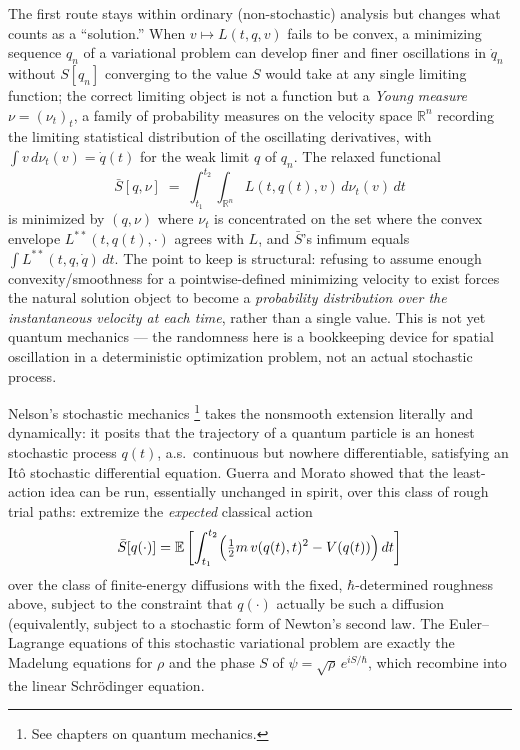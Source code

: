 The first route stays within ordinary (non-stochastic) analysis but changes
what counts as a ``solution.'' When $v\mapsto L(t,q,v)$ fails to be convex, a
minimizing sequence $q_n$ of a variational problem can develop finer and finer
oscillations in $\dot q_n$ without $S[q_n]$ converging to the value $S$ would
take at any single limiting function; the correct limiting object is not a
function but a \emph{Young measure} $\nu=(\nu_t)_{t}$, a family of probability
measures on the velocity space $\mathbb{R}^n$ recording the limiting statistical
distribution of the oscillating derivatives, with $\int v\,d\nu_t(v)=\dot q(t)$
for the weak limit $q$ of $q_n$. The relaxed functional
\[
\bar S[q,\nu] \;=\; \int_{t_1}^{t_2}\!\! \int_{\mathbb{R}^n} L(t,q(t),v)\, d\nu_t(v)\, dt
\]
is minimized by $(q,\nu)$ where $\nu_t$ is concentrated on the set where the
convex envelope $L^{\ast\ast}(t,q(t),\cdot)$ agrees with $L$, and $\bar S$'s
infimum equals $\int L^{\ast\ast}(t,q,\dot q)\,dt$. The point to keep is
structural: refusing to assume enough convexity/smoothness for a
pointwise-defined minimizing velocity to exist forces the natural solution
object to become a \emph{probability distribution over the instantaneous
velocity at each time}, rather than a single value. This is not yet quantum
mechanics --- the randomness here is a bookkeeping device for spatial
oscillation in a deterministic optimization problem, not an actual stochastic
process.

Nelson's stochastic mechanics \footnote{See chapters on quantum mechanics.}
takes the nonsmooth extension
literally and dynamically: it posits that the trajectory of a quantum particle
is an honest stochastic process $q(t)$, a.s.\ continuous but nowhere
differentiable, satisfying an It\^o stochastic differential equation.
Guerra and Morato showed that the least-action idea can
be run, essentially unchanged in spirit, over this class of rough trial paths:
extremize the \emph{expected} classical action
\[
\bar S[q(\cdot)]=\mathbb{E}\left[\int_{t_1}^{t_2} \Bigl(\tfrac12 m\, v(q(t),t)^2 
- V(q(t))\Bigr)\,dt\right]
\]
over the class of finite-energy diffusions with the fixed, $\hbar$-determined
roughness above, subject to the constraint that $q(\cdot)$ actually be such a
diffusion (equivalently, subject to a stochastic form of Newton's second law.
 The Euler--Lagrange equations of this stochastic
variational problem are exactly the Madelung equations for $\rho$ and the phase
$S$ of $\psi=\sqrt\rho\,e^{iS/\hbar}$, which recombine into the linear
Schr\"odinger equation.


